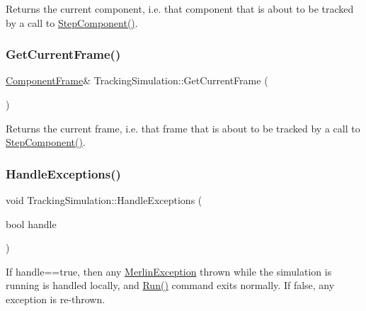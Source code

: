 Returns the current component, i.\+e. that component that is about to be tracked by a call to \hyperlink{classTrackingSimulation_a374d51e700bf2cdab374a6679c9bfe53}{Step\+Component()}. \mbox{\label{classTrackingSimulation_aa48c7809cc42ad03aaf5a8173ca0ca94}} 
\subsubsection{\texorpdfstring{Get\+Current\+Frame()}{GetCurrentFrame()}}
{\footnotesize\ttfamily \hyperlink{classComponentFrame}{Component\+Frame}\& Tracking\+Simulation\+::\+Get\+Current\+Frame (\begin{DoxyParamCaption}{ }\end{DoxyParamCaption})\hspace{0.3cm}{\ttfamily [inline]}}

Returns the current frame, i.\+e. that frame that is about to be tracked by a call to \hyperlink{classTrackingSimulation_a374d51e700bf2cdab374a6679c9bfe53}{Step\+Component()}. \mbox{\label{classTrackingSimulation_a5a2703dbc6eaaf1e35abfa327ddfbdf9}} 
\subsubsection{\texorpdfstring{Handle\+Exceptions()}{HandleExceptions()}}
{\footnotesize\ttfamily void Tracking\+Simulation\+::\+Handle\+Exceptions (\begin{DoxyParamCaption}\item[{bool}]{handle }\end{DoxyParamCaption})\hspace{0.3cm}{\ttfamily [inline]}}

If handle==true, then any \hyperlink{classMerlinException}{Merlin\+Exception} thrown while the simulation is running is handled locally, and \hyperlink{classTrackingSimulation_a09502165e1c358b1b30ff35a26910a1d}{Run()} command exits normally. If false, any exception is re-\/thrown. \mbox{\label{classTrackingSimulation_a30cc7ce6c637e8b1ce909288e1a13d61}} 
